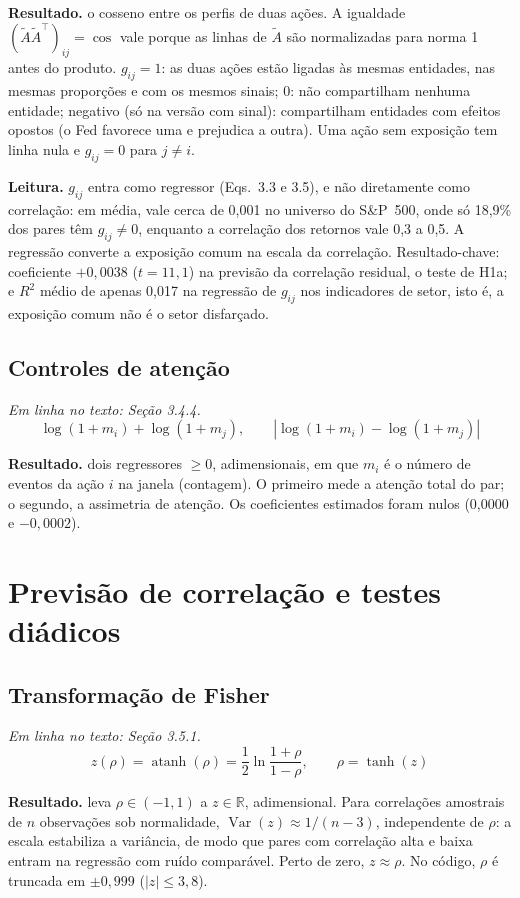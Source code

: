 \documentclass[11pt,a4paper]{article}
\newcommand{\resultado}[1]{\par\textbf{Resultado.} #1}
\newcommand{\leitura}[1]{\par\textbf{Leitura.} #1}
\newcommand{\R}{\mathbb R}
\begin{document}
\resultado{o cosseno entre os perfis de duas ações. A igualdade $(\tilde A\tilde A^\top)_{ij}=\cos$ vale
porque as linhas de $\tilde A$ são normalizadas para norma 1 antes do produto. $g_{ij}=1$: as duas ações
estão ligadas às mesmas entidades, nas mesmas proporções e com os mesmos sinais; $0$: não compartilham
nenhuma entidade; negativo (só na versão com sinal): compartilham entidades com efeitos opostos (o Fed
favorece uma e prejudica a outra). Uma ação sem exposição tem linha nula e $g_{ij}=0$ para $j\neq i$.}

\leitura{$g_{ij}$ entra como regressor (Eqs.~3.3 e 3.5), e não diretamente como correlação: em média, vale
cerca de 0,001 no universo do S\&P~500, onde só 18,9\% dos pares têm $g_{ij}\neq0$, enquanto a correlação
dos retornos vale 0,3 a 0,5. A regressão converte a exposição comum na escala da correlação. Resultado-chave: coeficiente $+0{,}0038$
($t=11{,}1$) na previsão da correlação residual, o teste de H1a; e $R^2$ médio de apenas 0,017 na regressão
de $g_{ij}$ nos indicadores de setor, isto é, a exposição comum não é o setor disfarçado.}

\subsection{Controles de atenção}

{\small\textit{Em linha no texto: Seção 3.4.4.}}
\[
  \log(1+m_i)+\log(1+m_j),\qquad |\log(1+m_i)-\log(1+m_j)|
\]

\resultado{dois regressores $\ge0$, adimensionais, em que $m_i$ é o número de eventos da ação $i$ na
janela (contagem). O primeiro mede a atenção total do par; o segundo, a assimetria de atenção. Os
coeficientes estimados foram nulos (0,0000 e $-0{,}0002$).}

\section{Previsão de correlação e testes diádicos}

\subsection{Transformação de Fisher}

{\small\textit{Em linha no texto: Seção 3.5.1.}}
\[
  z(\rho)=\operatorname{atanh}(\rho)=\frac12\ln\frac{1+\rho}{1-\rho},\qquad \rho=\tanh(z)
\]

\resultado{leva $\rho\in(-1,1)$ a $z\in\R$, adimensional. Para correlações amostrais de $n$ observações
sob normalidade, $\operatorname{Var}(z)\approx1/(n-3)$, independente de $\rho$: a escala estabiliza a
variância, de modo que pares com correlação alta e baixa entram na regressão com ruído comparável. Perto
de zero, $z\approx\rho$. No código, $\rho$ é truncada em $\pm0{,}999$ ($|z|\le3{,}8$).}
\end{document}
